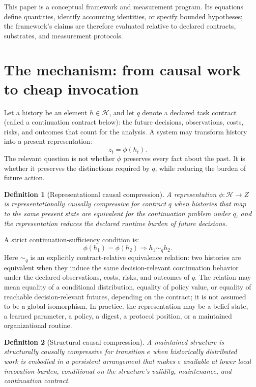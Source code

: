 \documentclass[11pt]{article}
\newtheorem{definition}{Definition}
\newcommand{\Hist}{\mathcal{H}}
\begin{document}
This paper is a conceptual framework and measurement program. Its equations define quantities, identify accounting identities, or specify bounded hypotheses; the framework's claims are therefore evaluated relative to declared contracts, substrates, and measurement protocols.

\section{The mechanism: from causal work to cheap invocation}

Let a history be an element \(h\in\Hist\), and let \(q\) denote a declared task contract (called a continuation contract below): the future decisions, observations, costs, risks, and outcomes that count for the analysis. A system may transform history into a present representation:
\[
z_t=\phi(h_t).
\]
The relevant question is not whether \(\phi\) preserves every fact about the past. It is whether it preserves the distinctions required by \(q\), while reducing the burden of future action.

\begin{definition}[Representational causal compression]
A representation \(\phi:\Hist\to Z\) is representationally causally compressive for contract \(q\) when histories that map to the same present state are equivalent for the continuation problem under \(q\), and the representation reduces the declared runtime burden of future decisions.
\end{definition}

A strict continuation-sufficiency condition is:
\[
\phi(h_1)=\phi(h_2)
\Rightarrow h_1\sim_q h_2.
\]
Here \(\sim_q\) is an explicitly contract-relative equivalence relation: two histories are equivalent when they induce the same decision-relevant continuation behavior under the declared observations, costs, risks, and outcomes of \(q\). The relation may mean equality of a conditional distribution, equality of policy value, or equality of reachable decision-relevant futures, depending on the contract; it is not assumed to be a global isomorphism. In practice, the representation may be a belief state, a learned parameter, a policy, a digest, a protocol position, or a maintained organizational routine.

\begin{definition}[Structural causal compression]
A maintained structure is structurally causally compressive for transition \(e\) when historically distributed work is embodied in a persistent arrangement that makes \(e\) available at lower local invocation burden, conditional on the structure's validity, maintenance, and continuation contract.
\end{definition}
\end{document}
